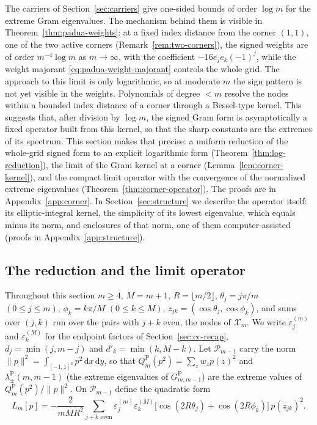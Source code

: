 \documentclass[preprint,12pt,a4paper]{elsarticle}
\theoremstyle{remark}
\newcommand{\Pa}{\mathrm P}
\newcommand{\dd}{\,\mathrm d}
\begin{document}
The carriers of Section~\ref{sec:carriers} give one-sided bounds of order
$\log m$ for the extreme Gram eigenvalues. The mechanism behind them is
visible in Theorem~\ref{thm:padua-weights}: at a fixed index distance from the
corner $(1,1)$, one of the two active corners (Remark~\ref{rem:two-corners}),
the signed weights are of order $m^{-4}\log m$ as $m\to\infty$, with the
coefficient $-16e_je_k(-1)^j$, while the weight majorant
\eqref{eq:padua-weight-majorant} controls the whole grid. The approach to this
limit is only logarithmic, so at moderate $m$ the sign pattern is not yet
visible in the weights.
Polynomials of degree $<m$ resolve the nodes within a bounded index distance
of a corner through a Bessel-type kernel. This suggests that, after division
by $\log m$, the signed Gram form is asymptotically a fixed operator built
from this kernel, so that the sharp constants are the extremes of its
spectrum. This section makes that precise: a uniform reduction of the
whole-grid signed form to an explicit logarithmic form
(Theorem~\ref{thm:log-reduction}), the limit of the Gram kernel at a corner
(Lemma~\ref{lem:corner-kernel}), and the compact limit operator with the
convergence of the normalized extreme eigenvalues
(Theorem~\ref{thm:corner-operator}). The proofs are in
Appendix~\ref{app:corner}. In Section~\ref{sec:structure} we describe the
operator itself: its elliptic-integral kernel, the simplicity of its lowest
eigenvalue, which equals minus its norm, and enclosures of that norm, one of
them computer-assisted (proofs in Appendix~\ref{app:structure}).

\subsection{The reduction and the limit operator}

Throughout this section $m\ge4$, $M=m+1$, $R=\lfloor m/2\rfloor$,
$\theta_j=j\pi/m$ $(0\le j\le m)$, $\phi_k=k\pi/M$ $(0\le k\le M)$,
$z_{jk}=(\cos\theta_j,\cos\phi_k)$, and sums over $(j,k)$ run over the pairs
with $j+k$ even, the nodes of $\mathcal X_m$. We write $\varepsilon^{(m)}_j$
and $\varepsilon^{(M)}_k$ for the endpoint factors of
Section~\ref{sec:cc-recap}, $d_j=\min(j,m-j)$ and $d'_k=\min(k,M-k)$.
Let $\mathcal P_{m-1}$ carry the norm $\|p\|^2=\int_{[-1,1]^2}p^2\dd x\dd y$,
so that $Q_m^\Pa(p^2)=\sum_zw_zp(z)^2$ and $\lambda^\Pa_\pm(m,m-1)$
(the extreme eigenvalues of $G^\Pa_{m,m-1}$) are the extreme values of
$Q_m^\Pa(p^2)/\|p\|^2$. On $\mathcal P_{m-1}$ define the quadratic form
\begin{equation}\label{eq:L-m}
 L_m[p]=-\frac2{mMR^2}\sum_{j+k\text{ even}}
   \varepsilon^{(m)}_j\varepsilon^{(M)}_k
   \bigl[\cos(2R\theta_j)+\cos(2R\phi_k)\bigr]\,p(z_{jk})^2 .
\end{equation}
\end{document}
